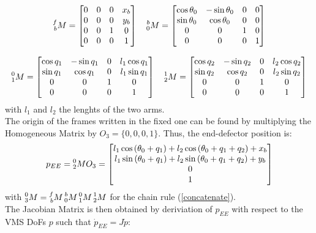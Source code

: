 \documentclass[a4paper,12pt,oneside]{report}
\begin{document}
\begin{equation}
  \begin{array}{c}
    \prescript{f}{b}{M}=\begin{bmatrix}
      0&0&0&x_b\\
    0&0&0&y_b\\
    0&0&1&0\\
    0&0&0&1
    \end{bmatrix}\quad
    \prescript{b}{0}{M}=\begin{bmatrix}
      \cos{\theta_0}&-\sin{\theta_0}&0&0\\
      \sin{\theta_0}&\cos{\theta_0}&0&0\\
      0&0&1&0\\
      0&0&0&1
    \end{bmatrix}\\ \\
    \prescript{0}{1}{M}=\begin{bmatrix}
      \cos{q_1}&-\sin{q_1}&0&l_1\cos{q_1}\\
      \sin{q_1}&\cos{q_1}&0&l_1\sin{q_1}\\
      0&0&1&0\\
      0&0&0&1
    \end{bmatrix}\quad
    \prescript{1}{2}{M}=\begin{bmatrix}
      \cos{q_2}&-\sin{q_2}&0&l_2\cos{q_2}\\
      \sin{q_2}&\cos{q_2}&0&l_2\sin{q_2}\\
      0&0&1&0\\
      0&0&0&1
    \end{bmatrix}
  \end{array}
\end{equation}
with $l_1$ and $l_2$ the lenghts of the two arms.\\
The origin of the frames written in the fixed one can be found by multiplying the Homogeneous Matrix by $O_3=\{0,0,0,1\}$. Thus, the end-defector position is:
\begin{equation}
  p_{EE}=\prescript{0}{2}{M}O_3= \begin{bmatrix}
    l_1\cos{(\theta_0+q_1)}+l_2\cos{(\theta_0+q_1+q_2)}+x_b\\
    l_1\sin{(\theta_0+q_1)}+l_2\sin{(\theta_0+q_1+q_2)}+y_b\\0\\1
   \end{bmatrix}
   \label{EE_position}
\end{equation}
with $\prescript{0}{3}{M}=\prescript{f}{b}{M}\prescript{b}{0}{M}\prescript{0}{1}{M}\prescript{1}{2}{M}$ for the chain rule (\ref{concatenate}).\\
The Jacobian Matrix is then obtained by deriviation of $p_{EE}$ with respect to the VMS DoFs $p$ such that $\dot{p}_{EE}=J\dot{p}$:
\end{document}
